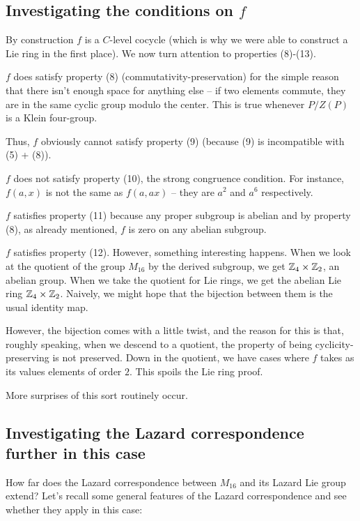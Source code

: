 \documentclass[10pt]{amsart}
\begin{document}
\subsection{Investigating the conditions on $f$}

By construction $f$ is a $C$-level cocycle (which is why we were able
to construct a Lie ring in the first place). We now turn attention to
properties (8)-(13).

$f$ does satisfy property (8) (commutativity-preservation) for the
simple reason that there isn't enough space for anything else -- if
two elements commute, they are in the same cyclic group modulo the
center. This is true whenever $P/Z(P)$ is a Klein four-group.

Thus, $f$ obviously cannot satisfy property (9) (because (9) is
incompatible with (5) + (8)).

$f$ does not satisfy property (10), the strong congruence
condition. For instance, $f(a,x)$ is not the same as $f(a,ax)$ -- they
are $a^2$ and $a^6$ respectively.

$f$ satisfies property (11) because any proper subgroup is abelian and
by property (8), as already mentioned, $f$ is zero on any abelian
subgroup.

$f$ satisfies property (12). However, something interesting
happens. When we look at the quotient of the group $M_{16}$ by the
derived subgroup, we get $\mathbb{Z}_4 \times \mathbb{Z}_2$, an abelian group. When we
take the quotient for Lie rings, we get the abelian Lie ring $\mathbb{Z}_4
\times \mathbb{Z}_2$. Naively, we might hope that the bijection between them
is the usual identity map.

However, the bijection comes with a little twist, and the reason for
this is that, roughly speaking, when we descend to a quotient, the
property of being cyclicity-preserving is not preserved. Down in the
quotient, we have cases where $f$ takes as its values elements of
order $2$. This spoils the Lie ring proof.

More surprises of this sort routinely occur.

\subsection{Investigating the Lazard correspondence further in this case}

How far does the Lazard correspondence between $M_{16}$ and its Lazard
Lie group extend? Let's recall some general features of the Lazard
correspondence and see whether they apply in this case:
\end{document}
